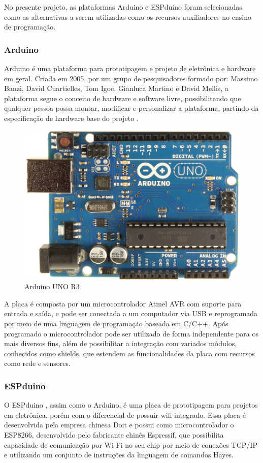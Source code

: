 \documentclass[12pt]{article}
\begin{document}
    No presente projeto, as plataformas Arduino e ESPduino foram selecionadas como as alternativas a serem utilizadas como os recursos auxiliadores no ensino de programação.    
    
    \subsubsection{Arduino}
Arduino é uma plataforma para prototipagem e projeto de eletrônica e hardware em geral. Criada em 2005, por um grupo de pesquisadores formado por: Massimo Banzi, David Cuartielles, Tom Igoe, Gianluca Martino e David Mellis, a plataforma segue o conceito de hardware e software livre, possibilitando que qualquer pessoa possa montar, modificar e personalizar a plataforma, partindo da especificação de hardware base do projeto \cite{arduino}.

\begin{figure}[!ht]
\centering
\includegraphics[keepaspectratio, width=0.4
\textwidth]{images/arduino_uno.jpg}
\caption{Arduino UNO R3}
\label{fig:arduino}
\end{figure}

A placa é composta por um microcontrolador Atmel AVR com suporte para entrada e saída, e pode ser conectada a um computador via USB e reprogramada por meio de uma linguagem de programação baseada em C/C++. Após programado o microcontrolador pode ser utilizado de forma independente para os mais diversos fins, além de possibilitar a integração com variados módulos, conhecidos como shields, que estendem as funcionalidades da placa com recursos como rede e sensores.
    
    \subsubsection{ESPduino}
O ESPduino \cite{espduino}, assim como o Arduino, é uma placa de prototipagem para projetos em eletrônica, porém com o diferencial de possuir wifi integrado. Essa placa é desenvolvida pela empresa chinesa Doit \cite{doit} e possui como microcontrolador o ESP8266, desenvolvido pelo fabricante chinês Espressif, que possibilita capacidade de comunicação por Wi-Fi no seu chip por meio de conexões TCP/IP e utilizando um conjunto de instruções da linguagem de comandos Hayes.
\end{document}
